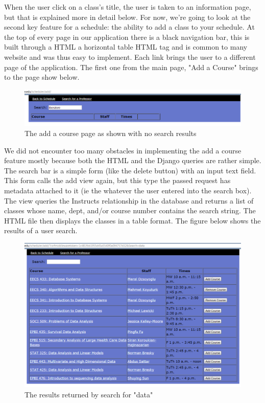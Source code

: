 \documentclass[pdftex,12pt,letter]{article}
\begin{document}
When the user click on a class's title, the user is taken to an information page, but that is explained more in detail below. For now, we're going to look at the second key feature for a schedule: the ability to add a class to your schedule. At the top of every page in our application there is a black navigation bar, this is built through a HTML a horizontal table HTML tag and is common to many website and was thus easy to implement. Each link brings the user to a different page of the application. The first one from the main page, "Add a Course" brings to the page show below.
\begin{figure}
\includegraphics[width=6in]{blankAdd.png}
\caption{The add a course page as shown with no search results}
\end{figure}
\FloatBarrier
We did not encounter too many obstacles in implementing the add a course feature mostly because both the HTML and the Django queries are rather simple. The search bar is a simple form (like the delete button) with an input text field. This form calls the add view again, but this type the passed request has metadata attached to it (ie the whatever the user entered into the search box). The view queries the Instructs relationship in the database and returns a list of classes whose name, dept, and/or course number contains the search string. The HTML file then displays the classes in a table format. The figure below shows the results of a user search.
\begin{figure}
\includegraphics[width=6in]{dataResults.png}
\caption{The results returned by search for "data"}
\end{figure}
\end{document}
